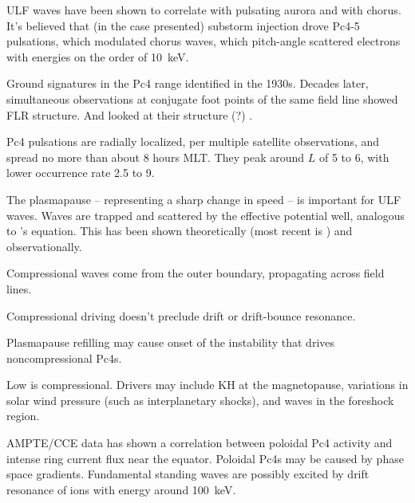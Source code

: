 ULF waves have been shown to correlate with pulsating aurora and with chorus\cite{jaynes_2015}. It's believed that (in the case presented) substorm injection drove Pc4-5 pulsations, which modulated chorus waves, which pitch-angle scattered electrons with energies on the order of \SI{10}{\kilo\eV}. 


Ground signatures in the Pc4 range identified in the 1930s\cite{angenheister_1931}. Decades later, simultaneous observations at conjugate foot points of the same field line showed FLR structure\cite{sigura_1961}. And looked at their structure (?) \cite{nagata_1963}. 


Pc4 pulsations are radially localized, per multiple satellite observations\cite{engebretson_1992}, and spread no more than about 8 hours MLT. They peak around $L$ of 5 to 6, with lower occurrence rate 2.5 to 9\cite{anderson_1990,liu_2009}.


The plasmapause -- representing a sharp change in \Alfven speed -- is important for ULF waves. Waves are trapped and scattered by the effective potential well, analogous to \Schrodinger's equation\cite{lee_1998,lee_1999,dai_2009}. This has been shown theoretically\cite{klimushkin_1998,leonovich_2000,klimushkin_2004,mager_2013} (most recent is \cite{mager_2013}) and observationally\cite{takahashi_2009,takahashi_2010}. 


Compressional waves come from the outer boundary, propagating across field lines\cite{lysak_1992}. 

Compressional driving doesn't preclude drift or drift-bounce resonance\cite{zong_2007,zong_2009}. 

Plasmapause refilling may cause onset of the instability that drives noncompressional Pc4s\cite{engebretson_1992,liu_2013}. 

Low \azm is compressional\cite{hughes_1994}. Drivers may include KH at the magnetopause\cite{chen_1974,southwood_1974,liu_2011}, variations in solar wind pressure (such as interplanetary shocks)\cite{zong_2007,zong_2009,hao_2014,degeling_2014,kessel_2008}, and waves in the foreshock region\cite{russell_1983,takahashi_2015}. 

AMPTE/CCE data has shown a correlation between poloidal Pc4 activity and intense ring current flux near the equator\cite{engebretson_1988}. Poloidal Pc4s may be caused by phase space gradients\cite{dai_2013}. Fundamental standing waves are possibly excited by drift resonance of ions with energy around \SI{100}{\kilo\eV}\cite{thompson_2001,dai_2013}.


